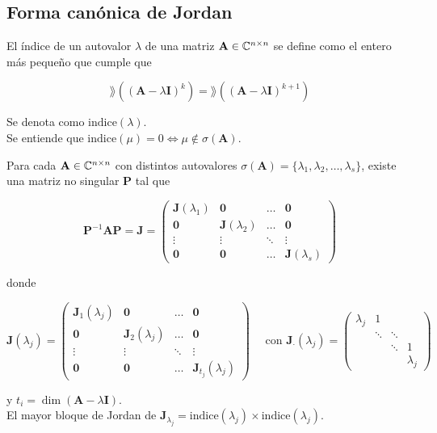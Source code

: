 \subsection{Forma canónica de Jordan}

\begin{defi}
El índice de un autovalor $\lambda$ de una matriz $\mathbf{A} \in \mathbb{C}^{n \times n}$ se define como el entero más pequeño que cumple que

\[ \rang((\mathbf{A} - \lambda \mathbf{I})^k) = \rang((\mathbf{A} - \lambda \mathbf{I})^{k+1}) \] 

Se denota como $\mathrm{indice}(\lambda)$.\\

Se entiende que $\mathrm{indice}(\mu) = 0 \iff \mu \not \in \sigma(\mathbf{A})$.
\end{defi}

\begin{teo}
Para cada $\mathbf{A} \in \mathbb{C}^{n \times n}$ con distintos autovalores $\sigma(\mathbf{A}) = \{\lambda_1, \lambda_2,\dots, \lambda_s \}$, existe una matriz no singular $\mathbf{P}$ tal que

\[ \mathbf{P}^{-1} \mathbf{A} \mathbf{P} = \mathbf{J} = \left(\begin{array}{cccc}
\mathbf{J}(\lambda_1) & \mathbf{0}            & \dots  & \mathbf{0}\\
\mathbf{0}            & \mathbf{J}(\lambda_2) & \dots  & \mathbf{0}\\
\vdots                & \vdots                & \ddots & \vdots\\
\mathbf{0}            & \mathbf{0}            & \dots  & \mathbf{J}(\lambda_s)
\end{array}\right) \]

donde 

\[ \mathbf{J}(\lambda_j) = \left(\begin{array}{cccc}
\mathbf{J}_1(\lambda_j) & \mathbf{0}              & \dots  & \mathbf{0}\\
\mathbf{0}              & \mathbf{J}_2(\lambda_j) & \dots  & \mathbf{0}\\
\vdots                  & \vdots                  & \ddots & \vdots\\
\mathbf{0}              & \mathbf{0}              & \dots  & \mathbf{J}_{t_j}(\lambda_j)
\end{array}\right) \quad \text{ con } \mathbf{J}_\cdot(\lambda_j) = 
\left(\begin{array}{cccc} 
\lambda_j & 1      &         & \\
          & \ddots & \ddots     & \\
          &        & \ddots     & 1\\
          &        &            & \lambda_j
\end{array}\right) \]

y $t_i = \dim(\mathbf{A} - \lambda \mathbf{I})$.\\

El mayor bloque de Jordan de $\mathbf{J}_{\lambda_j} = \mathrm{indice}(\lambda_j) \times \mathrm{indice}(\lambda_j)$.
\end{teo}